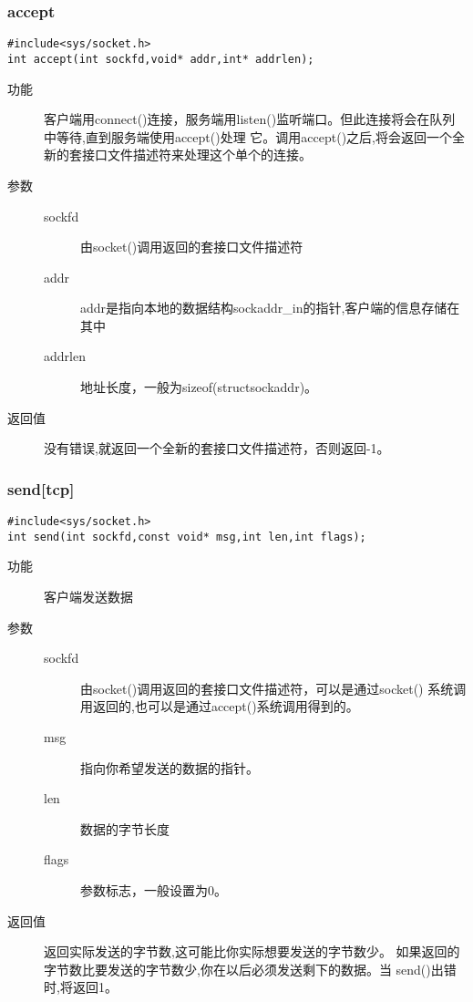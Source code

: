 \subsubsection{accept}
\begin{lstlisting}[style=C]
#include<sys/socket.h>
int accept(int sockfd,void* addr,int* addrlen);
\end{lstlisting}
\begin{description}
\item[功能]	客户端用connect()连接，服务端用listen()监听端口。但此连接将会在队列中等待,直到服务端使用accept()处理
它。调用accept()之后,将会返回一个全新的套接口文件描述符来处理这个单个的连接。
\item[参数]		 
\begin{description}
\item[sockfd]	由socket()调用返回的套接口文件描述符
\item[addr]		addr是指向本地的数据结构sockaddr\_{}in的指针,客户端的信息存储在其中
\item[addrlen]	地址长度，一般为sizeof(structsockaddr)。
\end{description}
\item[返回值]		没有错误,就返回一个全新的套接口文件描述符，否则返回-1。
\end{description}


\subsubsection{send[tcp]}
\begin{lstlisting}[style=C]
#include<sys/socket.h>
int send(int sockfd,const void* msg,int len,int flags);
\end{lstlisting}
\begin{description}
\item[功能]	客户端发送数据
\item[参数]		 
\begin{description}
\item[sockfd]	由socket()调用返回的套接口文件描述符，可以是通过socket()
系统调用返回的,也可以是通过accept()系统调用得到的。
\item[msg]		指向你希望发送的数据的指针。
\item[len]		数据的字节长度
\item[flags]		参数标志，一般设置为0。
\end{description}
\item[返回值]		返回实际发送的字节数,这可能比你实际想要发送的字节数少。
如果返回的字节数比要发送的字节数少,你在以后必须发送剩下的数据。当
send()出错时,将返回­1。
\end{description}


